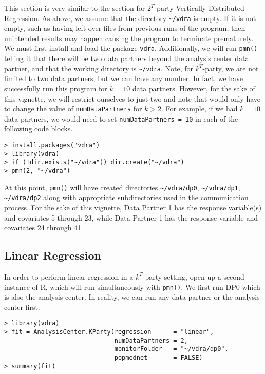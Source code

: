 \documentclass[12]{article}
\begin{document}
This section is very similar to the section for $2^T$-party Vertically Distributed Regression.  As above, we assume that the directory \verb"~/vdra" is empty.  If it is not empty, such as having left over files from previous runs of the program, then unintended results may happen causing the program to terminate prematurely.  We must first install and load the package \verb"vdra".  Additionally, we will run \verb"pmn()" telling it that there will be two data partners beyond the analysis center data partner, and that the working directory is \verb"~/vdra".  Note, for $k^T$-party, we are not limited to two data partners, but we can have any number.  In fact, we have successfully run this program for $k = 10$ data partners.  However, for the sake of this vignette, we will restrict ourselves to just two and note that would only have to change the value of \verb"numDataPartners" for $k > 2$. For example, if we had $k = 10$ data partners, we would need to set \verb"numDataPartners = 10" in each of the following code blocks.

\begin{verbatim}
> install.packages("vdra")
> library(vdra)
> if (!dir.exists("~/vdra")) dir.create("~/vdra")
> pmn(2, "~/vdra")
\end{verbatim}

At this point, \verb"pmn()" will have created directories \verb"~/vdra/dp0", \verb"~/vdra/dp1", \verb"~/vdra/dp2" along with appropriate subdirectories used in the communication process.  For the sake of this vignette, Data Partner 1 has the response variable(s) and covariates 5 through 23, while Data Partner 1 has the response variable and covariates 24 through 41


\subsection{Linear Regression}

In order to perform linear regression in a $k^T$-party setting, open up a second instance of R, which will run simultaneously with \verb"pmn()".  We first run DP0 which is also the analysis center.  In reality, we can run any data partner or the analysis center first.

\begin{verbatim}
> library(vdra)
> fit = AnalysisCenter.KParty(regression      = "linear",
                              numDataPartners = 2,
                              monitorFolder   = "~/vdra/dp0",
                              popmednet       = FALSE)
> summary(fit)
\end{verbatim}
\end{document}
